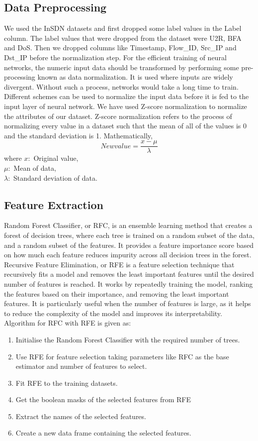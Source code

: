\subsection{Data Preprocessing}
\vspace{-18pt}
We used the InSDN datasets and first dropped some label values in the Label column. The label values that were dropped from the dataset were U2R, BFA and DoS. Then we dropped columns like Timestamp, Flow\_ID, Src\_IP and Dst\_IP before the normalization step. For the efficient training of neural networks, the numeric input data should be transformed by performing some pre-processing known as data normalization. It is used where inputs are widely divergent. Without such a process, networks would take a long time to train. Different schemes can be used to normalize the input data before it is fed to the input layer of neural network. We have used Z-score normalization to normalize the attributes of our dataset. Z-score normalization refers to the process of normalizing every value in a dataset such that the mean of all of the values is 0 and the standard deviation is 1. Mathematically,
\begin{equation}
New value = \frac{x- \mu}{\lambda}
\end{equation}
where $x: $ Original value,\\ $\mu: $ Mean of data,\\ $\lambda: $ Standard deviation of data.
\subsection{Feature Extraction}
\vspace{-18pt}
Random Forest Classifier, or RFC, is an ensemble learning method that creates a forest of decision trees, where each tree is trained on a random subset of the data, and a random subset of the features. It provides a feature importance score based on how much each feature reduces impurity across all decision trees in the forest. Recursive Feature Elimination, or RFE is a feature selection technique that recursively fits a model and removes the least important features until the desired number of features is reached. It works by repeatedly training the model, ranking the features based on their importance, and removing the least important features. It is particularly useful when the number of features is large, as it helps to reduce the complexity of the model and improves its interpretability.
Algorithm for RFC with RFE is given as:
\begin{enumerate}[label=\roman*.]
\item Initialise the Random Forest Classifier with the required number of trees.
\item Use RFE for feature selection taking parameters like RFC as the base estimator and number of features to select.
\item Fit RFE to the training datasets.
\item Get the boolean masks of the selected features from RFE
\item Extract the names of the selected features.
\item Create a new data frame containing the selected features.
\end{enumerate}
